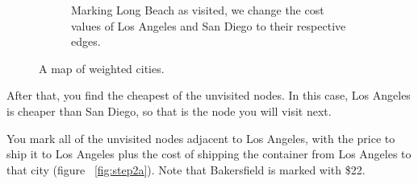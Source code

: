 \begin{figure}[H]
\begin{subfigure}{0.4\textwidth}
        \caption{Marking Long Beach as visited, we change the cost values of Los Angeles and San Diego to their respective edges.}
        \label{fig:step1b}
    \end{subfigure}

    \caption{A map of weighted cities.}
    \label{fig:step1}
\end{figure}

After that, you find the cheapest of the unvisited nodes.  In this case, Los
Angeles is cheaper than San Diego, so that is the node you will visit
next.

You mark all of the unvisited nodes adjacent to Los Angeles, with the
price to ship it to Los Angeles plus the cost of shipping the
container from Los Angeles to that city (figure ~\ref{fig:step2a}). Note that Bakersfield is
marked with \$22.

